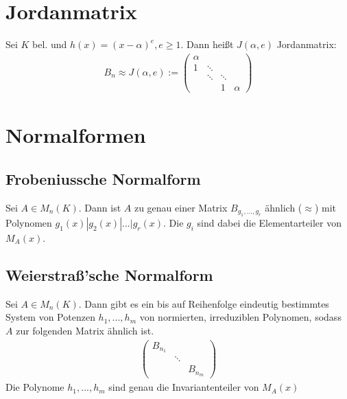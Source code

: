 \section{Jordanmatrix}
\begin{definition}
Sei $K$ bel. und $h(x)=(x-\alpha)^e, e \geq 1$. Dann heißt $J(\alpha,e)$ Jordanmatrix:
\begin{align*}
B_n \approx J(\alpha,e) :=
\begin{pmatrix}
\alpha &        &   &\\
1      & \ddots &   &\\
       & \ddots & \ddots &\\
       &        & 1 & \alpha
\end{pmatrix}
\end{align*}
\end{definition}
\section{Normalformen}
\subsection{Frobeniussche Normalform}
Sei $A \in M_n(K)$. Dann ist $A$ zu genau einer Matrix $B_{g_1,...,g_r}$ ähnlich ($\approx$) mit Polynomen $g_1(x) | g_2(x)| ... | g_r(x)$. Die $g_i$ sind dabei die Elementarteiler von $M_A(x)$.

\subsection{Weierstraß'sche Normalform}
Sei $A \in M_n(K)$. Dann gibt es ein bis auf Reihenfolge eindeutig bestimmtes System von Potenzen $h_1,...,h_m$ von normierten, irreduziblen Polynomen, sodass $A$ zur folgenden Matrix ähnlich ist.
\begin{align*}
\begin{pmatrix}
B_{n_1} &        & \\
        & \ddots & \\
        &		  & B_{n_m}
\end{pmatrix}
\end{align*}
Die Polynome $h_1,...,h_m$ sind genau die Invariantenteiler von $M_A(x)$

